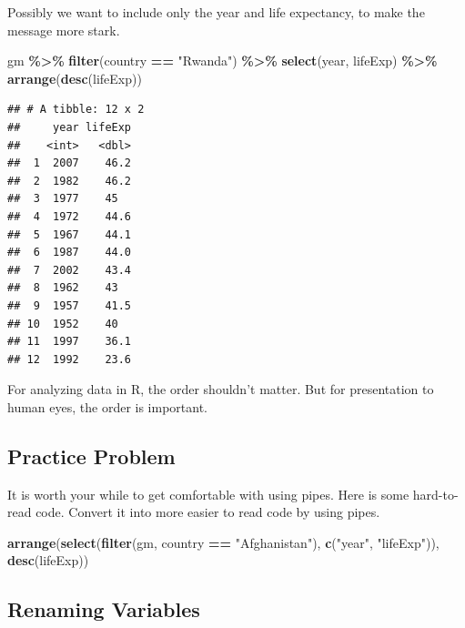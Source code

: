 \documentclass[
]{krantz}
\newenvironment{Shaded}{\begin{snugshade}}{\end{snugshade}}
\newcommand{\KeywordTok}[1]{\textcolor[rgb]{0.13,0.29,0.53}{\textbf{#1}}}
\newcommand{\NormalTok}[1]{#1}
\newcommand{\OperatorTok}[1]{\textcolor[rgb]{0.81,0.36,0.00}{\textbf{#1}}}
\newcommand{\StringTok}[1]{\textcolor[rgb]{0.31,0.60,0.02}{#1}}
\begin{document}
Possibly we want to include only the year and life expectancy, to make the message more stark.

\begin{Shaded}
\begin{Highlighting}[]
\NormalTok{gm }\OperatorTok{\%\textgreater{}\%}\StringTok{ }
\StringTok{  }\KeywordTok{filter}\NormalTok{(country }\OperatorTok{==}\StringTok{ "Rwanda"}\NormalTok{) }\OperatorTok{\%\textgreater{}\%}\StringTok{ }
\StringTok{  }\KeywordTok{select}\NormalTok{(year, lifeExp) }\OperatorTok{\%\textgreater{}\%}\StringTok{ }
\StringTok{  }\KeywordTok{arrange}\NormalTok{(}\KeywordTok{desc}\NormalTok{(lifeExp)) }
\end{Highlighting}
\end{Shaded}

\begin{verbatim}
## # A tibble: 12 x 2
##     year lifeExp
##    <int>   <dbl>
##  1  2007    46.2
##  2  1982    46.2
##  3  1977    45  
##  4  1972    44.6
##  5  1967    44.1
##  6  1987    44.0
##  7  2002    43.4
##  8  1962    43  
##  9  1957    41.5
## 10  1952    40  
## 11  1997    36.1
## 12  1992    23.6
\end{verbatim}

For analyzing data in R, the order shouldn't matter. But for presentation to human eyes, the order is important.

\hypertarget{ch6PP5}{%
\subsection{Practice Problem}\label{ch6PP5}}

It is worth your while to get comfortable with using pipes. Here is some hard-to-read code. Convert it into more easier to read code by using pipes.

\begin{Shaded}
\begin{Highlighting}[]
\KeywordTok{arrange}\NormalTok{(}\KeywordTok{select}\NormalTok{(}\KeywordTok{filter}\NormalTok{(gm, country }\OperatorTok{==}\StringTok{ "Afghanistan"}\NormalTok{), }
               \KeywordTok{c}\NormalTok{(}\StringTok{"year"}\NormalTok{, }\StringTok{"lifeExp"}\NormalTok{)), }\KeywordTok{desc}\NormalTok{(lifeExp))}
\end{Highlighting}
\end{Shaded}

\hypertarget{renaming-variables}{%
\subsection{Renaming Variables}\label{renaming-variables}}
\end{document}
